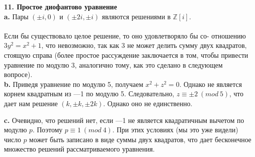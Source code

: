 \noindent\textbf{11. Простое \textbf{диофантово уравнение} } \newline 
\\
\hspace*{15pt}\textbf{a.} Пары $(\pm i,0)$ и $(\pm 2i,\pm i)$ являются решениями в $\mathbb{Z}[i]$.\\
\\
Если бы существовало целое решение, то оно удовлетворяло бы со-\linebreak
отношению $3y^2=x^2+1$, что невозможно, так как 3 не может делить\linebreak
\pagebreak
%
%
\noindent сумму двух квадратов, стоящую справа (более простое рассуждение \linebreak
за­ключается в том, чтобы привести уравнение по модулю 3, аналогично\linebreak
тому, как это сделано в следующем вопросе).\newline
\\
\hspace*{15pt}\textbf{b.} Приведя уравнение по модулю 5, получаем $x^2+z^2=0$. Однако не является корнем квадратным из —1 по модулю 5. Следовательно,\linebreak
$z\equiv\pm2~(mod~5)$, что дает нам решение $(k,\pm k,\pm 2k)$. Однако оно не\linebreak
единственно.\newline

\noindent\hspace*{15pt}\textbf{c.} Очевидно, что решений нет, если —1 не является квадратичным\linebreak
вычетом по модулю $p$. Поэтому $p\equiv1~(mod~4)$. При этих условиях (мы это\linebreak
уже видели) число $p$ может быть записано в виде суммы двух квадратов,\linebreak
что дает бесконечное множество решений рассматриваемого уравнения.\newline
\\

